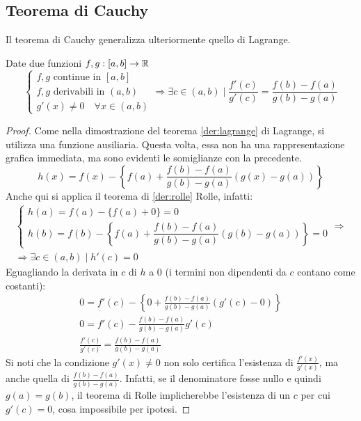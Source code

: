 \subsection{Teorema di Cauchy}
Il teorema di Cauchy generalizza ulteriormente quello di Lagrange.
\begin{teor}[di Cauchy]
	\label{der:cauchy}
	Date due funzioni $f,g:[a,b]\to\mathbb{R}$
	\[
		\begin{cases}
			f,g \text{ continue in }[a,b]   \\
			f,g \text{ derivabili in }(a,b) \\
			g'(x)\neq0\quad\forall x\in(a,b)
		\end{cases}\Rightarrow
		\exists c\in(a,b)\mid\frac{f'(c)}{g'(c)}=\frac{f(b)-f(a)}{g(b)-g(a)}
	\]
\end{teor}
\begin{proof}
	Come nella dimostrazione del teorema \ref{der:lagrange} di Lagrange, si utilizza una funzione ausiliaria. Questa volta, essa non ha una rappresentazione grafica immediata, ma sono evidenti le somiglianze con la precedente.
	\[
		h(x)=f(x)-\left\{f(a)+\frac{f(b)-f(a)}{g(b)-g(a)}(g(x)-g(a))\right\}
	\]
	Anche qui si applica il teorema di \ref{der:rolle} Rolle, infatti:
	\begin{gather*}
		\begin{cases}
			h(a)=f(a)-\{f(a)+0\}=0 \\
			h(b)=f(b)-\left\{f(a)+\dfrac{f(b)-f(a)}{g(b)-g(a)}(g(b)-g(a))\right\}=0
		\end{cases}\Rightarrow\\
		\Rightarrow\exists c\in(a,b)\mid h'(c)=0
	\end{gather*}
	Eguagliando la derivata in $c$ di $h$ a $0$ (i termini non dipendenti da $c$ contano come costanti):
	\begin{gather*}
		0=f'(c)-\left\{0+\frac{f(b)-f(a)}{g(b)-g(a)}(g'(c)-0)\right\}\\
		0=f'(c)-\frac{f(b)-f(a)}{g(b)-g(a)}g'(c)\\
		\frac{f'(c)}{g'(c)}=\frac{f(b)-f(a)}{g(b)-g(a)}
	\end{gather*}
	Si noti che la condizione $g'(x)\neq0$ non solo certifica l'esistenza di $\frac{f'(x)}{g'(x)}$, ma anche quella di $\frac{f(b)-f(a)}{g(b)-g(a)}$. Infatti, se il denominatore fosse nullo e quindi $g(a)=g(b)$, il teorema di Rolle implicherebbe l'esistenza di un $c$ per cui $g'(c)=0$, cosa impossibile per ipotesi.
\end{proof}


